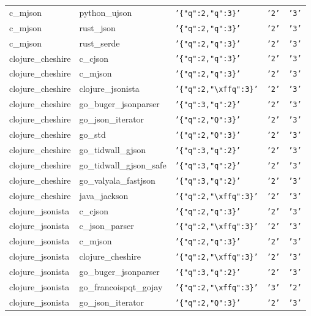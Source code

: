 \documentclass[english, 12pt, a4paper, sci, utf8, a-2b, online]{aaltothesis}
\def\str#1{\texttt{'#1'}}
\begin{document}
\begin{longtable}{lllll}
    c\_mjson & python\_ujson & \str{\{"q":2,"q":3\}} & \str{2} & \str{3} \\
    c\_mjson & rust\_json & \str{\{"q":2,"q":3\}} & \str{2} & \str{3} \\
    c\_mjson & rust\_serde & \str{\{"q":2,"q":3\}} & \str{2} & \str{3} \\
    clojure\_cheshire & c\_cjson & \str{\{"q":2,"q":3\}} & \str{2} & \str{3} \\
    clojure\_cheshire & c\_mjson & \str{\{"q":2,"q":3\}} & \str{2} & \str{3} \\
    clojure\_cheshire & clojure\_jsonista & \str{\{"q":2,"\textbackslash xffq":3\}} & \str{2} & \str{3} \\
    clojure\_cheshire & go\_buger\_jsonparser & \str{\{"q":3,"q":2\}} & \str{2} & \str{3} \\
    clojure\_cheshire & go\_json\_iterator & \str{\{"q":2,"Q":3\}} & \str{2} & \str{3} \\
    clojure\_cheshire & go\_std & \str{\{"q":2,"Q":3\}} & \str{2} & \str{3} \\
    clojure\_cheshire & go\_tidwall\_gjson & \str{\{"q":3,"q":2\}} & \str{2} & \str{3} \\
    clojure\_cheshire & go\_tidwall\_gjson\_safe & \str{\{"q":3,"q":2\}} & \str{2} & \str{3} \\
    clojure\_cheshire & go\_valyala\_fastjson & \str{\{"q":3,"q":2\}} & \str{2} & \str{3} \\
    clojure\_cheshire & java\_jackson & \str{\{"q":2,"\textbackslash xffq":3\}} & \str{2} & \str{3} \\
    clojure\_jsonista & c\_cjson & \str{\{"q":2,"q":3\}} & \str{2} & \str{3} \\
    clojure\_jsonista & c\_json\_parser & \str{\{"q":2,"\textbackslash xffq":3\}} & \str{2} & \str{3} \\
    clojure\_jsonista & c\_mjson & \str{\{"q":2,"q":3\}} & \str{2} & \str{3} \\
    clojure\_jsonista & clojure\_cheshire & \str{\{"q":2,"\textbackslash xffq":3\}} & \str{2} & \str{3} \\
    clojure\_jsonista & go\_buger\_jsonparser & \str{\{"q":3,"q":2\}} & \str{2} & \str{3} \\
    clojure\_jsonista & go\_francoispqt\_gojay & \str{\{"q":2,"\textbackslash xffq":3\}} & \str{3} & \str{2} \\
    clojure\_jsonista & go\_json\_iterator & \str{\{"q":2,"Q":3\}} & \str{2} & \str{3} \\

\end{longtable}
\end{document}
